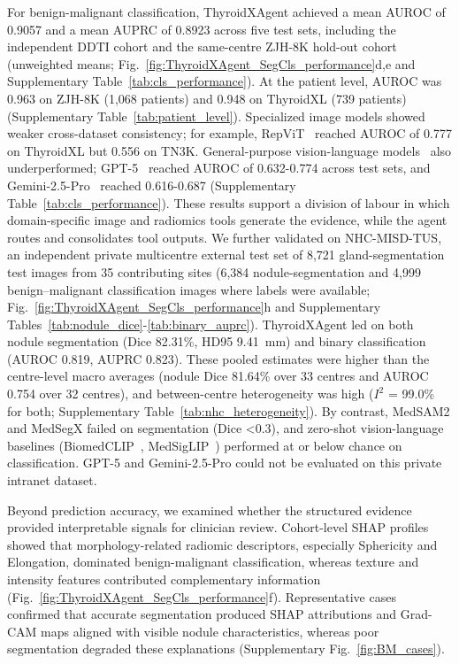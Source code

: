 \documentclass[fleqn,10pt]{wlscirep}
\begin{document}
For benign-malignant classification, ThyroidXAgent achieved a mean AUROC of 0.9057 and a mean AUPRC of 0.8923 across five test sets, including the independent DDTI cohort and the same-centre ZJH-8K hold-out cohort (unweighted means; Fig.~\ref{fig:ThyroidXAgent_SegCls_performance}d,e and Supplementary Table~\ref{tab:cls_performance}). At the patient level, AUROC was 0.963 on ZJH-8K (1,068 patients) and 0.948 on ThyroidXL (739 patients) (Supplementary Table~\ref{tab:patient_level}). Specialized image models showed weaker cross-dataset consistency; for example, RepViT~\cite{wang2023repvit} reached AUROC of 0.777 on ThyroidXL but 0.556 on TN3K. General-purpose vision-language models~\cite{dong2022survey} also underperformed; GPT-5~\cite{openai2025gpt5systemcard} reached AUROC of 0.632-0.774 across test sets, and Gemini-2.5-Pro~\cite{comanici_gemini_2025} reached 0.616-0.687 (Supplementary Table~\ref{tab:cls_performance}). These results support a division of labour in which domain-specific image and radiomics tools generate the evidence, while the agent routes and consolidates tool outputs. We further validated on NHC-MISD-TUS, an independent private multicentre external test set of 8,721 gland-segmentation test images from 35 contributing sites (6,384 nodule-segmentation and 4,999 benign--malignant classification images where labels were available; Fig.~\ref{fig:ThyroidXAgent_SegCls_performance}h and Supplementary Tables~\ref{tab:nodule_dice}-\ref{tab:binary_auprc}). ThyroidXAgent led on both nodule segmentation (Dice 82.31\%, HD95 9.41~mm) and binary classification (AUROC 0.819, AUPRC 0.823). These pooled estimates were higher than the centre-level macro averages (nodule Dice 81.64\% over 33 centres and AUROC 0.754 over 32 centres), and between-centre heterogeneity was high ($I^2$ = 99.0\% for both; Supplementary Table~\ref{tab:nhc_heterogeneity}). By contrast, MedSAM2 and MedSegX failed on segmentation (Dice <0.3), and zero-shot vision-language baselines (BiomedCLIP~\cite{zhang2024biomedclip}, MedSigLIP~\cite{sellergren2025medgemma}) performed at or below chance on classification. GPT-5 and Gemini-2.5-Pro could not be evaluated on this private intranet dataset.


Beyond prediction accuracy, we examined whether the structured evidence provided interpretable signals for clinician review. Cohort-level SHAP profiles~\cite{lundberg2017unified} showed that morphology-related radiomic descriptors, especially Sphericity and Elongation, dominated benign-malignant classification, whereas texture and intensity features contributed complementary information (Fig.~\ref{fig:ThyroidXAgent_SegCls_performance}f). Representative cases confirmed that accurate segmentation produced SHAP attributions and Grad-CAM maps aligned with visible nodule characteristics, whereas poor segmentation degraded these explanations (Supplementary Fig.~\ref{fig:BM_cases}).
\end{document}
